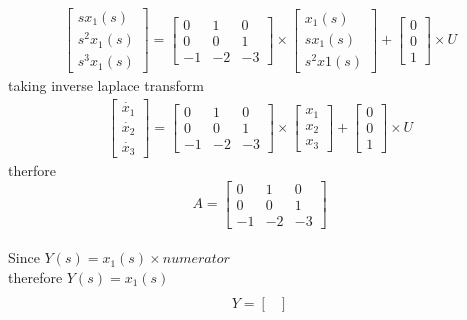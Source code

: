 \begin{enumerate}[label=\thesection.\arabic*.,ref=\thesection.\theenumi]
\begin{gather}
\begin{bmatrix}
sx_{1}(s)\\
s^2x_{1}(s)\\
s^3x_{1}(s)
\end{bmatrix}
=
\begin{bmatrix}
0&1&0\\
0&0&1\\
-1&-2&-3
\end{bmatrix}\times \begin{bmatrix}
x_{1}(s)\\
sx_{1}(s)\\
s^2x{1}(s)
\end{bmatrix}
+
\begin{bmatrix}
0\\
0\\
1
\end{bmatrix} \times U
\end{gather}
taking inverse laplace transform
\begin{gather}
\begin{bmatrix}
\dot{x_{1}}\\
\dot{x_{2}}\\
\dot{x_{3}}
\end{bmatrix}
=
\begin{bmatrix}
0&1&0\\
0&0&1\\
-1&-2&-3
\end{bmatrix}\times \begin{bmatrix}
x_{1}\\
x_{2}\\
x_{3}
\end{bmatrix}
+
\begin{bmatrix}
0\\
0\\
1
\end{bmatrix} \times U
\end{gather}
therfore
\begin{equation}
A=\begin{bmatrix}
0&1&0\\
0&0&1\\
-1&-2&-3
\end{bmatrix}
\end{equation}
\\
Since $ Y(s)=x_{1}(s)\times numerator$
\\therefore $ Y(s)=x_{1}(s) $
\begin{gather}
\\Y=
\begin{bmatrix}

\end{bmatrix}
\end{gather}
\end{enumerate}
